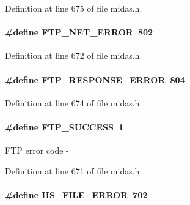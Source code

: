 \begin{DoxyItemize}
\item 
\end{DoxyItemize}

Definition at line 675 of file midas.h.
\paragraph[{FTP\_\-NET\_\-ERROR}]{\setlength{\rightskip}{0pt plus 5cm}\#define FTP\_\-NET\_\-ERROR~802}\hfill\label{group__err26_gaad8d88aaaaaa3706732a8a5aa00a6723}

\begin{DoxyItemize}
\item 
\end{DoxyItemize}

Definition at line 672 of file midas.h.
\paragraph[{FTP\_\-RESPONSE\_\-ERROR}]{\setlength{\rightskip}{0pt plus 5cm}\#define FTP\_\-RESPONSE\_\-ERROR~804}\hfill\label{group__err26_ga7f2618f2babfbc3f2fbd27523c218a1e}

\begin{DoxyItemize}
\item 
\end{DoxyItemize}

Definition at line 674 of file midas.h.
\paragraph[{FTP\_\-SUCCESS}]{\setlength{\rightskip}{0pt plus 5cm}\#define FTP\_\-SUCCESS~1}\hfill\label{group__err26_ga608032c83acbacc7557d2d04b9ad9a8b}
FTP error code -\/ 

Definition at line 671 of file midas.h.
\paragraph[{HS\_\-FILE\_\-ERROR}]{\setlength{\rightskip}{0pt plus 5cm}\#define HS\_\-FILE\_\-ERROR~702}\hfill\label{group__err26_ga564032fce62ccc4689bd3b5864ad0f9c}


